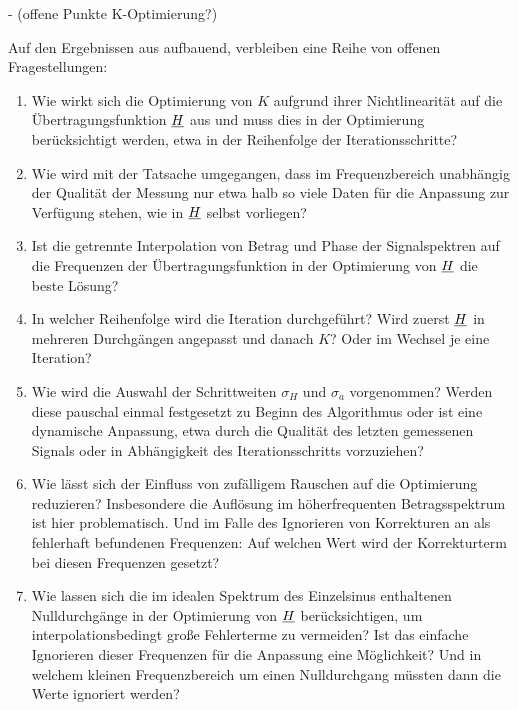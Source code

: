 \documentclass[../Report.tex]{subfiles}
\begin{document}
- (offene Punkte K-Optimierung?)


Auf den Ergebnissen aus  aufbauend, verbleiben eine Reihe von offenen Fragestellungen:

\begin{enumerate}
	\item 	Wie wirkt sich die Optimierung von $K$ aufgrund ihrer Nichtlinearität auf die Übertragungsfunktion $\underline{H}$ aus und muss dies in der Optimierung berücksichtigt werden, etwa in der Reihenfolge der Iterationsschritte?
	
	\item	Wie wird mit der Tatsache umgegangen, dass im Frequenzbereich unabhängig der Qualität der Messung nur etwa halb so viele Daten für die Anpassung zur Verfügung stehen, wie in $\underline{H}$ selbst vorliegen?
	
	\item 	Ist die getrennte Interpolation von Betrag und Phase der Signalspektren auf die Frequenzen der Übertragungsfunktion in der Optimierung von $\underline{H}$ die beste Lösung? 
	
	\item	In welcher Reihenfolge wird die Iteration durchgeführt? Wird zuerst $\underline{H}$ in mehreren Durchgängen angepasst und danach $K$? Oder im Wechsel je eine Iteration?
	
	\item 	Wie wird die Auswahl der Schrittweiten $\sigma_H$ und $\sigma_a$ vorgenommen? Werden diese pauschal einmal festgesetzt zu Beginn des Algorithmus oder ist eine dynamische Anpassung, etwa durch die Qualität des letzten gemessenen Signals oder in Abhängigkeit des Iterationsschritts vorzuziehen? 
	
	\item 	Wie lässt sich der Einfluss von zufälligem Rauschen auf die Optimierung reduzieren? Insbesondere die Auflösung im höherfrequenten Betragsspektrum ist hier problematisch. Und im Falle des Ignorieren von Korrekturen an als fehlerhaft befundenen Frequenzen: Auf welchen Wert wird der Korrekturterm bei diesen Frequenzen gesetzt?
	
	\item	Wie lassen sich die im idealen Spektrum des Einzelsinus enthaltenen Nulldurchgänge in der Optimierung von $\underline{H}$ berücksichtigen, um interpolationsbedingt große Fehlerterme zu vermeiden? Ist das einfache Ignorieren dieser Frequenzen für die Anpassung eine Möglichkeit? Und in welchem kleinen Frequenzbereich um einen Nulldurchgang müssten dann die Werte ignoriert werden?
	

\end{enumerate}
\end{document}
